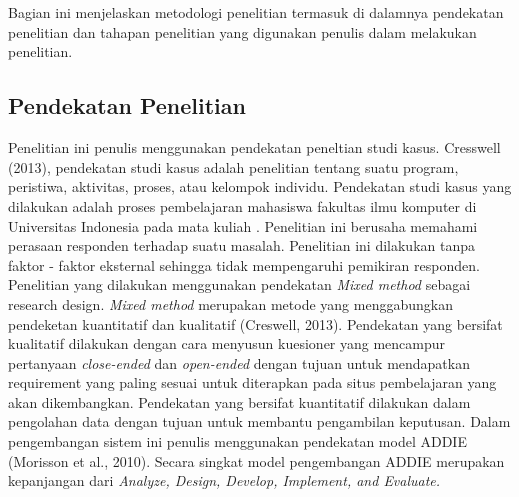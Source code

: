\chapter{\babTiga}
Bagian ini menjelaskan metodologi penelitian termasuk di dalamnya pendekatan penelitian dan tahapan penelitian yang digunakan penulis dalam melakukan penelitian.
\section{Pendekatan Penelitian}

Penelitian ini penulis menggunakan pendekatan peneltian studi kasus. Cresswell (2013), pendekatan studi kasus adalah penelitian tentang suatu program, peristiwa, aktivitas, proses, atau kelompok individu.
\linebreak\linebreak
Pendekatan studi kasus yang dilakukan adalah proses pembelajaran mahasiswa fakultas ilmu komputer di Universitas Indonesia pada mata kuliah {\ddp}. Penelitian ini berusaha memahami perasaan responden terhadap suatu masalah. Penelitian ini dilakukan tanpa faktor - faktor eksternal sehingga tidak mempengaruhi pemikiran responden.
\linebreak\linebreak
Penelitian yang dilakukan menggunakan pendekatan \textit{Mixed method} sebagai research design. \textit{Mixed method} merupakan metode yang menggabungkan pendeketan kuantitatif dan kualitatif (Creswell, 2013). Pendekatan yang bersifat kualitatif dilakukan dengan cara menyusun kuesioner yang mencampur pertanyaan \textit{close-ended} dan \textit{open-ended} dengan tujuan untuk mendapatkan requirement yang paling sesuai untuk diterapkan pada situs pembelajaran yang akan dikembangkan. Pendekatan yang bersifat kuantitatif dilakukan dalam pengolahan data dengan tujuan untuk membantu pengambilan keputusan.
\linebreak\linebreak
Dalam pengembangan sistem ini penulis menggunakan pendekatan model ADDIE  (Morisson et al., 2010). Secara singkat model pengembangan ADDIE merupakan kepanjangan dari \textit{Analyze, Design, Develop, Implement, and Evaluate.}

